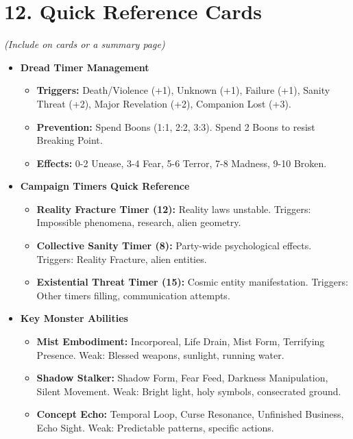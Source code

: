 \documentclass[11pt]{article}
\begin{document}
\section*{12. Quick Reference Cards}

\textit{(Include on cards or a summary page)}

\begin{itemize}
\item \textbf{Dread Timer Management}
\begin{itemize}
\item \textbf{Triggers:} Death/Violence (+1), Unknown (+1), Failure (+1), Sanity Threat (+2), Major Revelation (+2), Companion Lost (+3).
\item \textbf{Prevention:} Spend Boons (1:1, 2:2, 3:3). Spend 2 Boons to resist Breaking Point.
\item \textbf{Effects:} 0-2 Unease, 3-4 Fear, 5-6 Terror, 7-8 Madness, 9-10 Broken.
\end{itemize}

\item \textbf{Campaign Timers Quick Reference}
\begin{itemize}
\item \textbf{Reality Fracture Timer (12):} Reality laws unstable. Triggers: Impossible phenomena, research, alien geometry.
\item \textbf{Collective Sanity Timer (8):} Party-wide psychological effects. Triggers: Reality Fracture, alien entities.
\item \textbf{Existential Threat Timer (15):} Cosmic entity manifestation. Triggers: Other timers filling, communication attempts.
\end{itemize}

\item \textbf{Key Monster Abilities}
\begin{itemize}
\item \textbf{Mist Embodiment:} Incorporeal, Life Drain, Mist Form, Terrifying Presence. Weak: Blessed weapons, sunlight, running water.
\item \textbf{Shadow Stalker:} Shadow Form, Fear Feed, Darkness Manipulation, Silent Movement. Weak: Bright light, holy symbols, consecrated ground.
\item \textbf{Concept Echo:} Temporal Loop, Curse Resonance, Unfinished Business, Echo Sight. Weak: Predictable patterns, specific actions.
\end{itemize}


\end{itemize}
\end{document}
